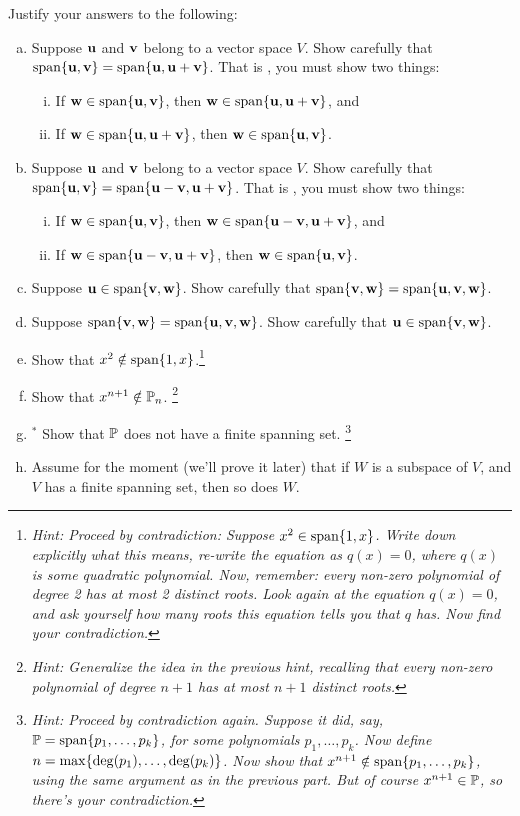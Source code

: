 \begin{prob}
\end{prob} \begin{prob} \label{prob06.4} Justify your answers to the following:
\medskip
\begin{enumerate}[a)]
\item Suppose $\mathbf{u}$ and $\mathbf{v}$ belong to a vector space $V$. Show carefully that $\textrm{span}\{\mathbf{u},\mathbf{v}\}=\textrm{span}\{\mathbf{u}, \mathbf{u}+\mathbf{v}\}$. That is , you must show two things:
\begin{enumerate}[(i)]
\item If $\mathbf{w}\in \textrm{span}\{\mathbf{u},\mathbf{v}\}$, then $\mathbf{w} \in \textrm{span}\{\mathbf{u}, \mathbf{u}+\mathbf{v}\}$, and
\item If $\mathbf{w}\in \textrm{span}\{\mathbf{u}, \mathbf{u}+\mathbf{v}\}$,  then $\mathbf{w}\in \textrm{span}\{\mathbf{u},\mathbf{v}\} $.
\end{enumerate}
\medskip
%
\item\sov Suppose $\mathbf{u}$ and $\mathbf{v}$ belong to a vector space $V$. Show carefully that $\textrm{span}\{\mathbf{u},\mathbf{v}\}=\textrm{span}\{\mathbf{u}-\mathbf{v}, \mathbf{u}+\mathbf{v}\}$. That is , you must show two things:
\begin{enumerate}[(i)]
\item If $\mathbf{w}\in \textrm{span}\{\mathbf{u},\mathbf{v}\}$, then $\mathbf{w} \in \textrm{span}\{\mathbf{u}-\mathbf{v}, \mathbf{u}+\mathbf{v}\}$, and
\item If $\mathbf{w}\in \textrm{span}\{\mathbf{u}-\mathbf{v}, \mathbf{u}+\mathbf{v}\}$,  then $\mathbf{w}\in \textrm{span}\{\mathbf{u},\mathbf{v}\} $.
\end{enumerate}
\medskip
%
%
\item  Suppose $\mathbf{u} \in \textrm{span}\{\mathbf{v},\mathbf{w}\}$. Show carefully that $\textrm{span}\{\mathbf{v},\mathbf{w}\}=\textrm{span}\{\mathbf{u},\mathbf{v},\mathbf{w}\}$.
\medskip
%

\item\sov  Suppose $\textrm{span}\{\mathbf{v},\mathbf{w}\}=\textrm{span}\{\mathbf{u},\mathbf{v},\mathbf{w}\}$. Show carefully that $\mathbf{u} \in \textrm{span}\{\mathbf{v},\mathbf{w}\}$. 
\medskip
%
\item Show that $x^2 \notin \textrm{span}\{1,x\}$.\footnote{\it  Hint: Proceed by contradiction: Suppose $x^2 \in \textrm{span}\{1,x\}$. Write down explicitly what this means, re-write the equation as $q(x)=0$, where $q(x)$ is some quadratic polynomial. Now, remember: every non-zero polynomial of degree 2 has at most 2 distinct roots. Look again at the equation $q(x)=0$, and ask yourself how many roots this equation tells you that $q$ has. Now find your contradiction.}
\medskip
%
\item\sov  Show that $x^{n+1} \notin \mathbb{P}_n$. \footnote{\it  Hint: Generalize the idea in the previous hint, recalling that every non-zero polynomial of degree $n+1$ has at most $n+1$ distinct roots.}
\medskip
%
\item$^\ast$ Show that $\mathbb{P}$ does not have a finite spanning set. \footnote{\it  Hint: Proceed by contradiction again. Suppose it did, say,  $\mathbb{P}=\textrm{span}\{p_1, \dots, p_k\}$, for some polynomials $p_1, \dots, p_k$. Now define $n=\max\{\deg(p_1), \dots, \deg(p_k) \}$. Now show that $x^{n+1}\notin\textrm{span}\{p_1, \dots, p_k\}$, using the same argument as in the previous part. But of course $x^{n+1} \in \mathbb{P}$, so there's your contradiction. }
\medskip
%
\item\sov Assume for the moment (we'll prove it later) that if $W$ is a subspace of $V$, and $V$ has a finite spanning set, then so does $W$. 


\end{enumerate}
\end{prob}

